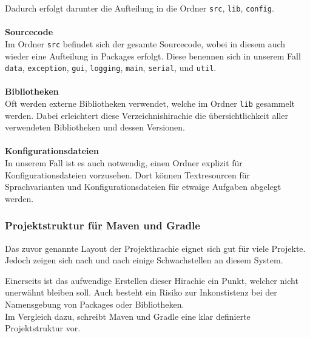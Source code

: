 Dadurch erfolgt darunter die Aufteilung in die Ordner \lstinline{src}, \lstinline{lib}, \lstinline{config}.
\\\\
\textbf{Sourcecode}
\\
Im Ordner \lstinline{src} befindet sich der gesamte Sourcecode, wobei in diesem auch wieder eine Aufteilung in Packages erfolgt.
Diese benennen sich in unserem Fall \lstinline{data}, \lstinline{exception}, \lstinline{gui}, \lstinline{logging}, \lstinline{main}, \lstinline{serial}, und \lstinline{util}.
\\\\
\textbf{Bibliotheken}
\\
Oft werden externe Bibliotheken verwendet, welche im Ordner \lstinline{lib} gesammelt werden.
Dabei erleichtert diese Verzeichnishirachie die übersichtlichkeit aller verwendeten Bibliotheken und dessen Versionen.
\\\\
\textbf{Konfigurationsdateien}
\\
In unserem Fall ist es auch notwendig, einen Ordner explizit für Konfigurationsdateien vorzusehen.
Dort können Textresourcen für Sprachvarianten und Konfigurationsdateien für etwaige Aufgaben abgelegt werden.

\subsubsection{Projektstruktur für Maven und Gradle}
Das zuvor genannte Layout der Projekthrachie eignet sich gut für viele Projekte.
Jedoch zeigen sich nach und nach einige Schwachstellen an diesem System.

Einerseits ist das aufwendige Erstellen dieser Hirachie ein Punkt, welcher nicht unerwähnt bleiben soll.
Auch besteht ein Risiko zur Inkonstistenz bei der Namensgebung von Packages oder Bibliotheken. \\
Im Vergleich dazu, schreibt Maven und Gradle eine klar definierte Projektstruktur vor.


